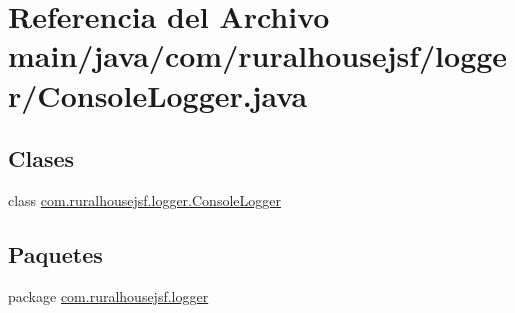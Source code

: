 \hypertarget{a00071}{}\section{Referencia del Archivo main/java/com/ruralhousejsf/logger/\+Console\+Logger.java}
\label{a00071}
\subsection*{Clases}
\begin{DoxyCompactItemize}
\item 
class \mbox{\hyperlink{a00220}{com.\+ruralhousejsf.\+logger.\+Console\+Logger}}
\end{DoxyCompactItemize}
\subsection*{Paquetes}
\begin{DoxyCompactItemize}
\item 
package \mbox{\hyperlink{a00119}{com.\+ruralhousejsf.\+logger}}
\end{DoxyCompactItemize}
